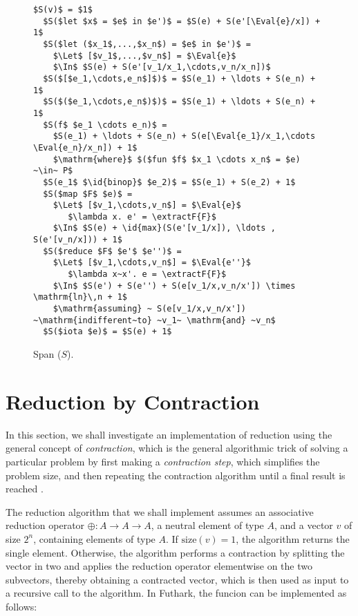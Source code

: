 \documentclass[oneside,11pt]{book}
\begin{document}
\begin{figure}
\begin{lstlisting}[mathescape=true]
  $S(v)$ = $1$
  $S($let $x$ = $e$ in $e')$ = $S(e) + S(e'[\Eval{e}/x]) + 1$
  $S($let ($x_1$,...,$x_n$) = $e$ in $e')$ =
    $\Let$ [$v_1$,...,$v_n$] = $\Eval{e}$
    $\In$ $S(e) + S(e'[v_1/x_1,\cdots,v_n/x_n])$
  $S($[$e_1,\cdots,e_n$]$)$ = $S(e_1) + \ldots + S(e_n) + 1$
  $S($($e_1,\cdots,e_n$)$)$ = $S(e_1) + \ldots + S(e_n) + 1$
  $S(f$ $e_1 \cdots e_n)$ =
    $S(e_1) + \ldots + S(e_n) + S(e[\Eval{e_1}/x_1,\cdots \Eval{e_n}/x_n]) + 1$
    $\mathrm{where}$ $($fun $f$ $x_1 \cdots x_n$ = $e) ~\in~ P$
  $S(e_1$ $\id{binop}$ $e_2)$ = $S(e_1) + S(e_2) + 1$
  $S($map $F$ $e)$ =
    $\Let$ [$v_1,\cdots,v_n$] = $\Eval{e}$
       $\lambda x. e' = \extractF{F}$
    $\In$ $S(e) + \id{max}(S(e'[v_1/x]), \ldots , S(e'[v_n/x])) + 1$
  $S($reduce $F$ $e'$ $e'')$ =
    $\Let$ [$v_1,\cdots,v_n$] = $\Eval{e''}$
       $\lambda x~x'. e = \extractF{F}$
    $\In$ $S(e') + S(e'') + S(e[v_1/x,v_n/x']) \times \mathrm{ln}\,n + 1$
    $\mathrm{assuming} ~ S(e[v_1/x,v_n/x']) ~\mathrm{indifferent~to} ~v_1~ \mathrm{and} ~v_n$
  $S($iota $e)$ = $S(e) + 1$
\end{lstlisting}

\caption{Span ($S$).}
\label{fig:span}
\end{figure}

\section{Reduction by Contraction}

In this section, we shall investigate an implementation of reduction
using the general concept of \emph{contraction}, which is the general
algorithmic trick of solving a particular problem by first making a
\emph{contraction step}, which simplifies the problem size, and then
repeating the contraction algorithm until a final result is reached
\cite{algdesign:parseq2016}.

The reduction algorithm that we shall implement assumes an associative
reduction operator $\oplus : A \rightarrow A \rightarrow A$, a neutral
element of type $A$, and a vector $v$ of size $2^n$, containing
elements of type $A$. If $\mathrm{size}(v) = 1$, the algorithm returns
the single element. Otherwise, the algorithm performs a contraction by
splitting the vector in two and applies the reduction operator
elementwise on the two subvectors, thereby obtaining a contracted
vector, which is then used as input to a recursive call to the
algorithm. In Futhark, the funcion  can be implemented as
follows:
\end{document}
